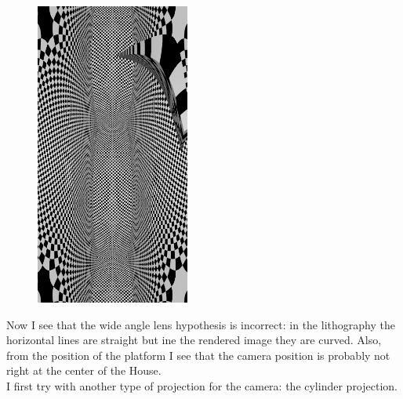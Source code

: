 \documentclass[12pt, a4paper]{article}
\begin{document}
\begin{scriptsize}
\begin{ttfamily}

\end{ttfamily}
\end{scriptsize}

\begin{center}
\begin{figure}[H]
\centering
\includegraphics[height=10cm]{./XL-51_3.png}\\
\end{figure}
\end{center}

Now I see that the wide angle lens hypothesis is incorrect: in the lithography the horizontal lines are straight but ine the rendered image they are curved. Also, from the position of the platform I see that the camera position is probably not right at the center of the House.\\

I first try with another type of projection for the camera: the cylinder projection.\\

\begin{scriptsize}
\begin{ttfamily}

\end{ttfamily}
\end{scriptsize}
\end{document}
